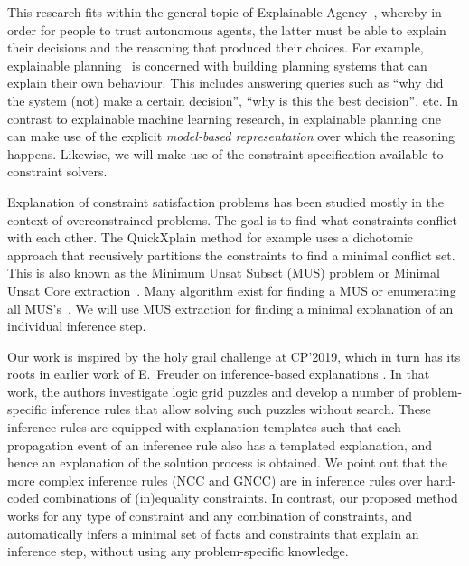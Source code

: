This research fits within the general topic of Explainable Agency~\cite{langley2017explainable}, whereby in order for people to trust autonomous agents, the latter must be able to explain their decisions and the reasoning that produced their choices. 
For example, explainable planning~\cite{fox2017explainable} is concerned with building planning systems that can explain their own behaviour. This includes answering queries such as ``why did the system (not) make a certain decision'', ``why is this the best decision'', etc. In contrast to explainable machine learning research, in explainable planning one can make use of the explicit \textit{model-based representation} over which the reasoning happens. Likewise, we will make use of the constraint specification available to constraint solvers. %

Explanation of constraint satisfaction problems has been studied mostly in the context of overconstrained problems. The goal is to find what constraints conflict with each other. The QuickXplain method \cite{junker2001quickxplain} for example uses a dichotomic approach that recusively partitions the constraints to find a minimal conflict set. This is also known as the Minimum Unsat Subset (MUS) problem or Minimal Unsat Core extraction~\cite{marques2010minimal}. Many algorithm exist for finding a MUS or enumerating all MUS's~\cite{marques2010minimal}. We will use MUS extraction for finding a minimal explanation of an individual inference step.

Our work is inspired by the holy grail challenge at CP'2019, which in turn has its roots in earlier work of E.~Freuder on inference-based explanations \cite{sqalli1996inference}. In that work, the authors investigate logic grid puzzles and develop a number of problem-specific inference rules that allow solving such puzzles without search. These inference rules are equipped with explanation templates such that each propagation event of an inference rule also has a templated explanation, and hence an explanation of the solution process is obtained. We point out that the more complex inference rules (NCC and GNCC) are in inference rules over hard-coded combinations of (in)equality constraints. In contrast, our proposed method works for any type of constraint and any combination of constraints, and automatically infers a minimal set of facts and constraints that explain an inference step, without using any problem-specific knowledge. %

